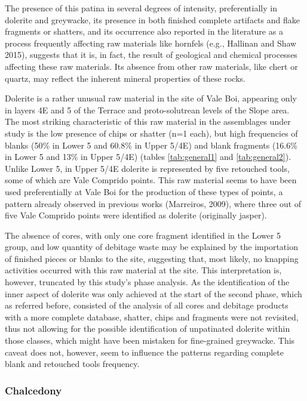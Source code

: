 \documentclass[12pt,twoside]{reedthesis}
\begin{document}
The presence of this patina in several degrees of intensity, preferentially in dolerite and greywacke, its presence in both finished complete artifacts and flake fragments or shatters, and its occurrence also reported in the literature as a process frequently affecting raw materials like hornfels (e.g., Hallinan and Shaw 2015), suggests that it is, in fact, the result of geological and chemical processes affecting these raw materials. Its absence from other raw materials, like chert or quartz, may reflect the inherent mineral properties of these rocks.

Dolerite is a rather unusual raw material in the site of Vale Boi, appearing only in layers 4E and 5 of the Terrace and proto-solutrean levels of the Slope area. The most striking characteristic of this raw material in the assemblages under study is the low presence of chips or shatter (n=1 each), but high frequencies of blanks (50\% in Lower 5 and 60.8\% in Upper 5/4E) and blank fragments (16.6\% in Lower 5 and 13\% in Upper 5/4E) (tables \ref{tab:general1} and \ref{tab:general2}). Unlike Lower 5, in Upper 5/4E dolerite is represented by five retouched tools, some of which are Vale Comprido points. This raw material seems to have been used preferentially at Vale Boi for the production of these types of points, a pattern already observed in previous works (Marreiros, 2009), where three out of five Vale Comprido points were identified as dolerite (originally jasper).

The absence of cores, with only one core fragment identified in the Lower 5 group, and low quantity of debitage waste may be explained by the importation of finished pieces or blanks to the site, suggesting that, most likely, no knapping activities occurred with this raw material at the site. This interpretation is, however, truncated by this study's phase analysis. As the identification of the inner aspect of dolerite was only achieved at the start of the second phase, which as referred before, consisted of the analysis of all cores and debitage products with a more complete database, shatter, chips and fragments were not revisited, thus not allowing for the possible identification of unpatinated dolerite within those classes, which might have been mistaken for fine-grained greywacke. This caveat does not, however, seem to influence the patterns regarding complete blank and retouched tools frequency.

\hypertarget{chalcedony}{%
\subsubsection{Chalcedony}\label{chalcedony}}
\end{document}
